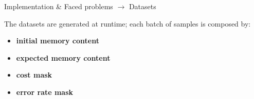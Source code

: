 \documentclass[xcolor={usenames}]{beamer}
\begin{document}
  \begin{frame}{Implementation \& Faced problems \(\rightarrow\) Datasets}
  	\begin{minipage}{0.41\textwidth}
  		The datasets are generated at runtime; each batch of samples is composed by:
		\begin{itemize}
			\item{\textbf{initial memory content}}
			\item{\textbf{expected memory content}}
			\item{\textbf{cost mask}}
			\item{\textbf{error rate mask}}
		\end{itemize}
  	\end{minipage}
  	\hfill
  	\begin{minipage}{0.58\textwidth}
  		\begin{table}[h]
		\centering
			\caption{Reverse task.}
		\end{table}
  	\end{minipage}
  \end{frame}

\end{document}
